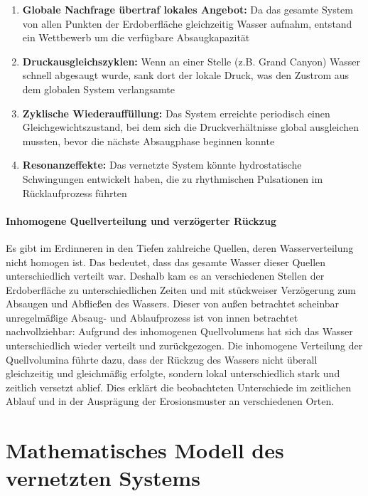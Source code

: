 ﻿\documentclass[12pt,a4paper]{report}
\begin{document}
\begin{enumerate}
	\item \textbf{Globale Nachfrage übertraf lokales Angebot:} Da das gesamte System von allen Punkten der Erdoberfläche gleichzeitig Wasser aufnahm, entstand ein Wettbewerb um die verfügbare Absaugkapazität
	
	\item \textbf{Druckausgleichszyklen:} Wenn an einer Stelle (z.B. Grand Canyon) Wasser schnell abgesaugt wurde, sank dort der lokale Druck, was den Zustrom aus dem globalen System verlangsamte
	
	\item \textbf{Zyklische Wiederauffüllung:} Das System erreichte periodisch einen Gleichgewichtszustand, bei dem sich die Druckverhältnisse global ausgleichen mussten, bevor die nächste Absaugphase beginnen konnte
	
	\item \textbf{Resonanzeffekte:} Das vernetzte System könnte hydrostatische Schwingungen entwickelt haben, die zu rhythmischen Pulsationen im Rücklaufprozess führten
\end{enumerate}

\paragraph{Inhomogene Quellverteilung und verzögerter Rückzug}
Es gibt im Erdinneren in den Tiefen zahlreiche Quellen, deren Wasserverteilung nicht homogen ist. Das bedeutet, dass das gesamte Wasser dieser Quellen unterschiedlich verteilt war. Deshalb kam es an verschiedenen Stellen der Erdoberfläche zu unterschiedlichen Zeiten und mit stückweiser Verzögerung zum Absaugen und Abfließen des Wassers. Dieser von außen betrachtet scheinbar unregelmäßige Absaug- und Ablaufprozess ist von innen betrachtet nachvollziehbar: Aufgrund des inhomogenen Quellvolumens hat sich das Wasser unterschiedlich wieder verteilt und zurückgezogen. Die inhomogene Verteilung der Quellvolumina führte dazu, dass der Rückzug des Wassers nicht überall gleichzeitig und gleichmäßig erfolgte, sondern lokal unterschiedlich stark und zeitlich versetzt ablief. Dies erklärt die beobachteten Unterschiede im zeitlichen Ablauf und in der Ausprägung der Erosionsmuster an verschiedenen Orten.

\section{Mathematisches Modell des vernetzten Systems}
\end{document}

